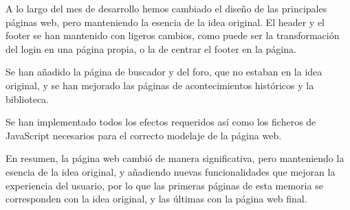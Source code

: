 \documentclass{article}
\begin{document}
\noindent
A lo largo del mes de desarrollo hemos cambiado el diseño de las principales páginas web, pero manteniendo la esencia de la idea original. El header y el footer se han mantenido con ligeros cambios, como puede ser la transformación del login en una página propia, o la de centrar el footer en la página.


\noindent
Se han añadido la página de buscador y del foro, que no estaban en la idea original, y se han mejorado las páginas de acontecimientos históricos y la biblioteca.


\noindent
Se han implementado todos los efectos requeridos así como los ficheros de JavaScript necesarios para el correcto modelaje de la página web. 


\noindent
En resumen, la página web cambió de manera significativa, pero manteniendo la esencia de la idea original, y añadiendo nuevas funcionalidades que mejoran la experiencia del usuario, por lo que las primeras páginas de esta memoria se corresponden con la idea original, y las últimas con la página web final.
\end{document}
